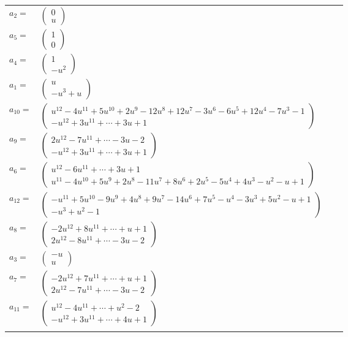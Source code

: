 \documentclass[1p]{elsarticle_modified}
\theoremstyle{definition}
\begin{document}
\begin{tabular}{m{7pt} m{180pt} m{7pt} m{180pt} }
\flushright $a_{2}=$&$\begin{pmatrix}0\\u\end{pmatrix}$ \\
\flushright $a_{5}=$&$\begin{pmatrix}1\\0\end{pmatrix}$ \\
\flushright $a_{4}=$&$\begin{pmatrix}1\\- u^2\end{pmatrix}$ \\
\flushright $a_{1}=$&$\begin{pmatrix}u\\- u^3+u\end{pmatrix}$ \\
\flushright $a_{10}=$&$\begin{pmatrix}u^{12}-4 u^{11}+5 u^{10}+2 u^9-12 u^8+12 u^7-3 u^6-6 u^5+12 u^4-7 u^3-1\\- u^{12}+3 u^{11}+\cdots+3 u+1\end{pmatrix}$ \\
\flushright $a_{9}=$&$\begin{pmatrix}2 u^{12}-7 u^{11}+\cdots-3 u-2\\- u^{12}+3 u^{11}+\cdots+3 u+1\end{pmatrix}$ \\
\flushright $a_{6}=$&$\begin{pmatrix}u^{12}-6 u^{11}+\cdots+3 u+1\\u^{11}-4 u^{10}+5 u^9+2 u^8-11 u^7+8 u^6+2 u^5-5 u^4+4 u^3- u^2- u+1\end{pmatrix}$ \\
\flushright $a_{12}=$&$\begin{pmatrix}- u^{11}+5 u^{10}-9 u^9+4 u^8+9 u^7-14 u^6+7 u^5- u^4-3 u^3+5 u^2- u+1\\- u^3+u^2-1\end{pmatrix}$ \\
\flushright $a_{8}=$&$\begin{pmatrix}-2 u^{12}+8 u^{11}+\cdots+u+1\\2 u^{12}-8 u^{11}+\cdots-3 u-2\end{pmatrix}$ \\
\flushright $a_{3}=$&$\begin{pmatrix}- u\\u\end{pmatrix}$ \\
\flushright $a_{7}=$&$\begin{pmatrix}-2 u^{12}+7 u^{11}+\cdots+u+1\\2 u^{12}-7 u^{11}+\cdots-3 u-2\end{pmatrix}$ \\
\flushright $a_{11}=$&$\begin{pmatrix}u^{12}-4 u^{11}+\cdots+u^2-2\\- u^{12}+3 u^{11}+\cdots+4 u+1\end{pmatrix}$\\&\end{tabular}
\end{document}
